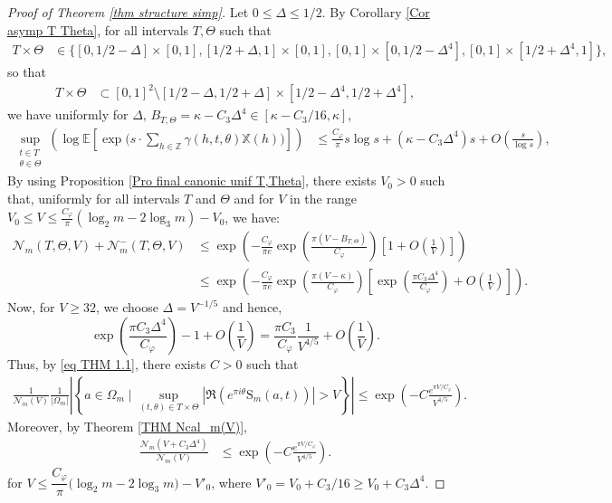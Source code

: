 \documentclass[10pt,a4paper]{amsart}
\def\B{\mathrm{S}}
\def\E{\mathbb{E}}
\def\Mp{C_\varphi}
\def\Ncal{\mathcal{N}}
\def\X{\mathbb{X}}
\def\Z{\mathbb{Z}}
\begin{document}
\begin{proof}[Proof of Theorem \ref{thm structure simp}] 
 Let $ 0\leq  \Delta \leq 1/2$.
By Corollary \ref{Cor asymp T Theta}, for all intervals $T,\Theta$ such that 
\begin{align*}
T\times\Theta 
& \in \{[0,1/2-\Delta]\times [0,1], [1/2+\Delta,1]\times [0,1], [0,1]\times[0,1/2-\Delta^4], [0,1]\times [1/2+\Delta^4,1]\},
\end{align*}
so that
\begin{align*}
T\times\Theta &\subset [0,1]^2\setminus[1/2-\Delta,1/2+\Delta]\times[1/2-\Delta^4,1/2+\Delta^4],
\end{align*} 
we have uniformly for $\Delta$, $B_{T,\Theta} = \kappa - C_3 \Delta^4\in [\kappa- C_3/16,\kappa]$,
\begin{align*}
\sup_{\substack{t\in T\\ \theta\in\Theta}}
\left(
\log \E \left[\exp \Big(s \cdot \sum_{h \in \Z}
   \gamma(h,t,\theta)\X(h)\Big) \right] \right)
     &\leq  \frac{\Mp}{\pi} s \log s+(\kappa - C_3 \Delta^4) s+ O\left(\frac{s}{\log s}\right),
\end{align*}
By using Proposition
\ref{Pro final canonic unif T,Theta}, there exists $V_0>0$ such that, uniformly for all intervals $T$ and $\Theta$ and for $V$ in the range $V_0\leq V \leq \frac{\Mp}{\pi}\left(\log_2 m-2\log_3 m\right)-V_0$, we have:
\begin{align*}
    \Ncal_m(T,\Theta,V)+ \Ncal_m^-(T,\Theta,V)
    &\leq 
\exp\left(- \frac{\Mp}{\pi e} \exp\left(\frac{\pi (V-B_{T,\Theta})}{\Mp}\right)\left[1+O\left(\frac{1}{V}\right)\right] 
\right)\\
&\leq \exp\left(- \frac{\Mp}{\pi e} \exp\left(\frac{\pi (V-\kappa)}{\Mp}\right)\left[\exp\left(\frac{\pi C_3 \Delta^4}{\Mp}\right)
+O\left(\frac{1}{V}\right)\right] 
\right).
\end{align*}
Now, for $V\geq 32$, we choose $\Delta = V^{-1/5}$ and hence,
\[\exp\left(\frac{\pi C_3 \Delta^4}{\Mp}\right)-1 +O\left(\frac{1}{V}\right)=\frac{\pi C_3}{\Mp}\frac{1}{V^{4/5}} +O\left(\frac{1}{V}\right)
.\]
Thus, by \eqref{eq THM 1.1}, there exists $C>0$ such that
\begin{align}\label{eq N(T,theta) C_3 D^4}
\frac{1}{\Ncal_m(V)}\frac{1}{|\Omega_m|}\left|\left\{
a\in \Omega_m \;\big|\; 
\sup_{(t,\theta) \in T\times\Theta}
\left|
\Re\left(e^{\pi i\theta}\B_m(a,t)\right) \right|
>V
\right\}\right|
\leq  
\exp\left(- C\frac{e^{\pi V/\Mp}}{V^{4/5}}\right)  .
\end{align}
Moreover, by Theorem \ref{THM Ncal_m(V)}, 
\begin{align}\label{eq N(V+C_3 D^4)}
\frac{\Ncal_m\left(V+C_3 \Delta^4 \right)}{\Ncal_m(V)}
&\leq  
\exp\left(- C\frac{e^{\pi V/\Mp}}{V^{4/5}}\right) .
\end{align}
for $V \leq
\dfrac{\Mp}{\pi}\big(\log_2 m-2\log_3 m\big)-V'_0$, where $V'_0 = V_0+ C_3/16\geq V_0 +C_3 \Delta ^4$. 


\end{proof}
\end{document}
